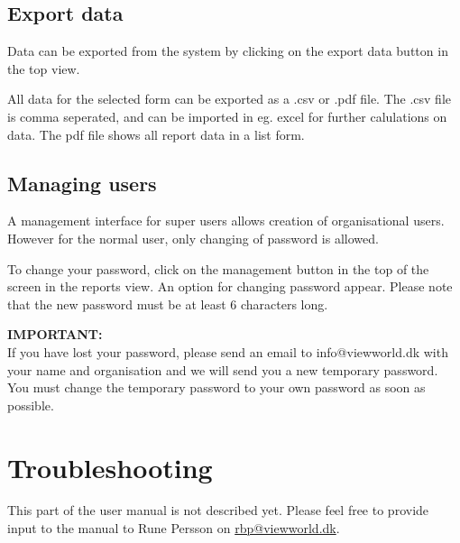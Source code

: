 \documentclass[a4paper, 12pt, final]{article}
\begin{document}
\subsection{Export data}

Data can be exported from the system by clicking on the export data button in the top view.

All data for the selected form can be exported as a .csv or .pdf file. The .csv file is comma seperated, and can be imported in eg. excel for further calulations on data. The pdf file shows all report data in a list form.

\subsection{Managing users}

A management interface for super users allows creation of organisational users. However for the normal user, only changing of password is allowed.

To change your password, click on the management button in the top of the screen in the reports view. An option for changing password appear. Please note that the new password must be at least 6 characters long.

\vspace{0.5cm}
\begin{boxedminipage}{\textwidth}
\textbf{IMPORTANT:}\\If you have lost your password, please send an email to info@viewworld.dk with your name and organisation and we will send you a new temporary password. You must change the temporary password to your own password as soon as possible.\end{boxedminipage}


\section{Troubleshooting}

This part of the user manual is not described yet. Please feel free to provide input to the manual to Rune Persson on \url{rbp@viewworld.dk}.
\end{document}
